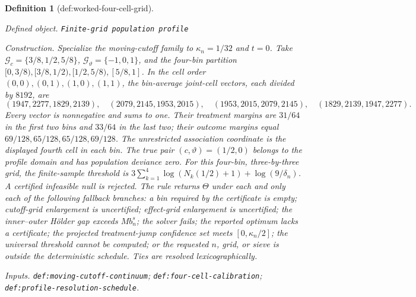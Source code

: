 \documentclass{article}
\newtheorem{definition}{Definition}
\begin{document}
\begin{definition}[def:worked-four-cell-grid]\label{def:worked-four-cell-grid}
\par\smallskip\noindent\emph{Defined object.} \texttt{Finite-\allowbreak{}grid population profile}
\par\smallskip\noindent\emph{Construction.} Specialize the moving-cutoff family to \(\kappa_n=1/32\) and \(t=0\). Take \(\mathcal G_c=\{3/8,1/2,5/8\}\), \(\mathcal G_\vartheta=\{-1,0,1\}\), and the four-bin partition \([0,3/8),[3/8,1/2),[1/2,5/8),[5/8,1]\). In the cell order \((0,0),(0,1),(1,0),(1,1)\), the bin-average joint-cell vectors, each divided by \(8192\), are \[(1947,2277,1829,2139),\quad(2079,2145,1953,2015),\quad(1953,2015,2079,2145),\quad(1829,2139,1947,2277).\] Every vector is nonnegative and sums to one. Their treatment margins are \(31/64\) in the first two bins and \(33/64\) in the last two; their outcome margins equal \(69/128,65/128,65/128,69/128\). The unrestricted association coordinate is the displayed fourth cell in each bin. The true pair \((c,\vartheta)=(1/2,0)\) belongs to the profile domain and has population deviance zero. For this four-bin, three-by-three grid, the finite-sample threshold is \(3\sum_{k=1}^4\log(N_k(1/2)+1)+\log(9/\delta_n)\). A certified infeasible null is rejected. The rule returns \(\Theta\) under each and only each of the following fallback branches: a bin required by the certificate is empty; cutoff-grid enlargement is uncertified; effect-grid enlargement is uncertified; the inner--outer H\"older gap exceeds \(M b_n^s\); the solver fails; the reported optimum lacks a certificate; the projected treatment-jump confidence set meets \([0,\kappa_n/2]\); the universal threshold cannot be computed; or the requested \(n\), grid, or sieve is outside the deterministic schedule. Ties are resolved lexicographically.
\par\smallskip\noindent\emph{Inputs.} \texttt{def:\allowbreak{}moving-\allowbreak{}cutoff-\allowbreak{}continuum}; \texttt{def:\allowbreak{}four-\allowbreak{}cell-\allowbreak{}calibration}; \texttt{def:\allowbreak{}profile-\allowbreak{}resolution-\allowbreak{}schedule}.
\end{definition}
\end{document}

